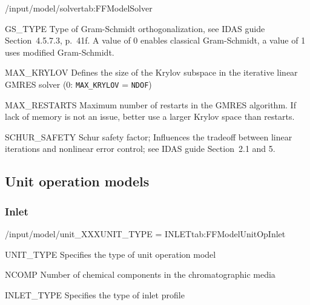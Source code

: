 \begin{groupscope}{/input/model/solver}{tab:FFModelSolver}
  \begin{dataset}[type=int,range={$\{0, 1\}$},length=1]{GS\_TYPE}
    Type of Gram-Schmidt orthogonalization, see IDAS guide Section~4.5.7.3, p.~41f.
    A value of $0$ enables classical Gram-Schmidt, a value of 1 uses modified Gram-Schmidt.
  \end{dataset}
  \begin{dataset}[type=int,range={$\{0, \dots, \texttt{NDOF}\}$},length=1]{MAX\_KRYLOV}
    Defines the size of the Krylov subspace in the iterative linear GMRES solver (0: \texttt{MAX\_KRYLOV} = \texttt{NDOF})
  \end{dataset}
  \begin{dataset}[type=int,range={$\geq 0$},length=1]{MAX\_RESTARTS}
    Maximum number of restarts in the GMRES algorithm. If lack of memory is not an issue, better use a larger Krylov space than restarts.
  \end{dataset}
  \begin{dataset}[type=double,range={$\geq 0$},length=1]{SCHUR\_SAFETY}
    Schur safety factor; Influences the tradeoff between linear iterations and nonlinear error control; see IDAS guide Section~2.1 and 5.
  \end{dataset}
\end{groupscope}

\subsection{Unit operation models}\label{sec:FFModelUnitOp}

\subsubsection{Inlet}

\begin{condsubgroup}{/input/model/unit\_XXX}{UNIT\_TYPE = INLET}{tab:FFModelUnitOpInlet}
  \begin{dataset}[type=string,range={\texttt{INLET}},length=1]{UNIT\_TYPE}
    Specifies the type of unit operation model
  \end{dataset}
  \begin{dataset}[type=int,range={$\geq 1$},length=1]{NCOMP}
    Number of chemical components in the chromatographic media
  \end{dataset}
  \begin{dataset}[type=string,range={\texttt{PIECEWISE\_CUBIC\_POLY}},length=1]{INLET\_TYPE}
    Specifies the type of inlet profile
  \end{dataset}
\end{condsubgroup}

